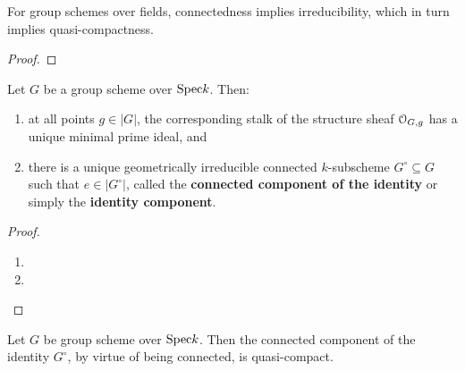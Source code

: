             \begin{lemma} \label{lemma: irreducibility_quasi_compactness_connectedness_of_group_schemes_over_fields}
                For group schemes over fields, connectedness implies irreducibility, which in turn implies quasi-compactness. 
            \end{lemma}
                \begin{proof}
                    
                \end{proof} 
            \begin{proposition} \label{prop: existence_of_identity_components_of_group_schemes_over_fields}
                Let $G$ be a group scheme over $\mathrm{Spec} k$. Then:
                    \begin{enumerate}
                        \item at all points $g \in |G|$, the corresponding stalk of the structure sheaf $\mathcal{O}_{G, g}$ has a unique minimal prime ideal, and
                        \item there is a unique geometrically irreducible connected $k$-subscheme $G^{\circ} \subseteq G$ such that $e \in |G^{\circ}|$, called the \textbf{connected component of the identity} or simply the \textbf{identity component}.
                    \end{enumerate}
            \end{proposition}
                \begin{proof}
                    \noindent
                    \begin{enumerate}
                        \item 
                        \item 
                    \end{enumerate}
                \end{proof}
            \begin{corollary}
                Let $G$ be group scheme over $\mathrm{Spec} k$. Then the connected component of the identity $G^{\circ}$, by virtue of being connected, is quasi-compact. 
            \end{corollary}
                
